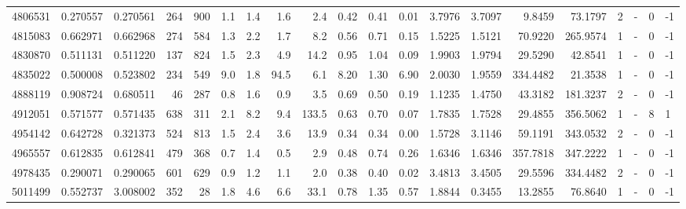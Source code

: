 \begin{tabular}{rrrrrrrrrrrrrrrrrlrl}
   4806531 & 0.270557 &   0.270561 &  264 &  900 &      1.1 &      1.4 &     1.6 &      2.4 &       0.42 &        0.41 &        0.01 &  3.7976 &  3.7097 &    9.8459 &   73.1797 &       2 &             - &        0 &        -1 \\
   4815083 & 0.662971 &   0.662968 &  274 &  584 &      1.3 &      2.2 &     1.7 &      8.2 &       0.56 &        0.71 &        0.15 &  1.5225 &  1.5121 &   70.9220 &  265.9574 &       1 &             - &        0 &        -1 \\
   4830870 & 0.511131 &   0.511220 &  137 &  824 &      1.5 &      2.3 &     4.9 &     14.2 &       0.95 &        1.04 &        0.09 &  1.9903 &  1.9794 &   29.5290 &   42.8541 &       1 &             - &        0 &        -1 \\
   4835022 & 0.500008 &   0.523802 &  234 &  549 &      9.0 &      1.8 &    94.5 &      6.1 &       8.20 &        1.30 &        6.90 &  2.0030 &  1.9559 &  334.4482 &   21.3538 &       1 &             - &        0 &        -1 \\
   4888119 & 0.908724 &   0.680511 &   46 &  287 &      0.8 &      1.6 &     0.9 &      3.5 &       0.69 &        0.50 &        0.19 &  1.1235 &  1.4750 &   43.3182 &  181.3237 &       2 &             - &        0 &        -1 \\
   4912051 & 0.571577 &   0.571435 &  638 &  311 &      2.1 &      8.2 &     9.4 &    133.5 &       0.63 &        0.70 &        0.07 &  1.7835 &  1.7528 &   29.4855 &  356.5062 &       1 &             - &        8 &         1 \\
   4954142 & 0.642728 &   0.321373 &  524 &  813 &      1.5 &      2.4 &     3.6 &     13.9 &       0.34 &        0.34 &        0.00 &  1.5728 &  3.1146 &   59.1191 &  343.0532 &       2 &             - &        0 &        -1 \\
   4965557 & 0.612835 &   0.612841 &  479 &  368 &      0.7 &      1.4 &     0.5 &      2.9 &       0.48 &        0.74 &        0.26 &  1.6346 &  1.6346 &  357.7818 &  347.2222 &       1 &             - &        0 &        -1 \\
   4978435 & 0.290071 &   0.290065 &  601 &  629 &      0.9 &      1.2 &     1.1 &      2.0 &       0.38 &        0.40 &        0.02 &  3.4813 &  3.4505 &   29.5596 &  334.4482 &       2 &             - &        0 &        -1 \\
   5011499 & 0.552737 &   3.008002 &  352 &   28 &      1.8 &      4.6 &     6.6 &     33.1 &       0.78 &        1.35 &        0.57 &  1.8844 &  0.3455 &   13.2855 &   76.8640 &       1 &             - &        0 &        -1 \\

\end{tabular}
